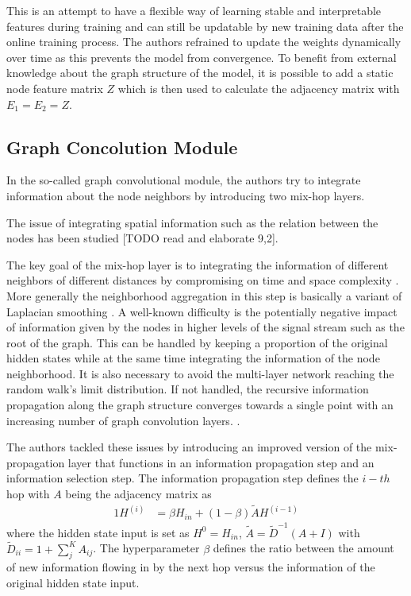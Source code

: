 \documentclass[letterpaper,twocolumn,11pt]{article}
\begin{document}
    This is an attempt to have a flexible way of learning stable and interpretable features during training and can still be updatable by new training data after the online training process.
    The authors refrained to update the weights dynamically over time as this prevents the model from convergence.
    To benefit from external knowledge about the graph structure of the model, it is possible to add a static node feature matrix $Z$
    which is then used to calculate the adjacency matrix with $E_1 =  E_2 = Z $.

    \subsection{Graph Concolution Module}
    In the so-called graph convolutional module, the authors try to integrate information about the node neighbors by introducing two mix-hop layers.

    The issue of integrating spatial information such as the relation between the nodes has been studied [TODO read and elaborate 9,2].

    The key goal of the mix-hop layer is to integrating the information of different neighbors of different distances by compromising on time and space complexity \cite{AbuElHaija}.
    More generally the neighborhood aggregation in this step is basically a variant of Laplacian smoothing \cite{leskovec2005graphs}.
    A well-known difficulty is the potentially negative impact of information given by the nodes in higher levels of the signal stream such as the root of the graph.
    This can be handled by keeping a proportion of the original hidden states while at the same time integrating the information
    of the node neighborhood.
    It is also necessary to avoid the multi-layer network reaching the random walk's limit distribution.
    If not handled, the recursive information propagation along the graph structure converges towards a single point with an increasing number of graph convolution layers. \cite{klicpera2018predict}.

    The authors tackled these issues by introducing an improved version of the mix-propagation layer that functions in an
    information propagation step and an information selection step.
    The information propagation step defines the $i-th$ hop with $A$ being the adjacency matrix as
    \begin{alignat}{1}
        H^{(i)} &= \beta H_{in} + (1-\beta) \tilde{A} H^{(i-1)} \label{eq:hop}
    \end{alignat}
    where the hidden state input is set as $H^0 = H_{in}$, $\tilde{A} = \tilde{D}^{-1}(A +I)$ with $\tilde{D}_{ii}=1 + \sum_{j}^{K}A_{ij}$.
    The hyperparameter $\beta$ defines the ratio between the amount of new information flowing in by the next hop versus the information of the original hidden state input.
\end{document}
